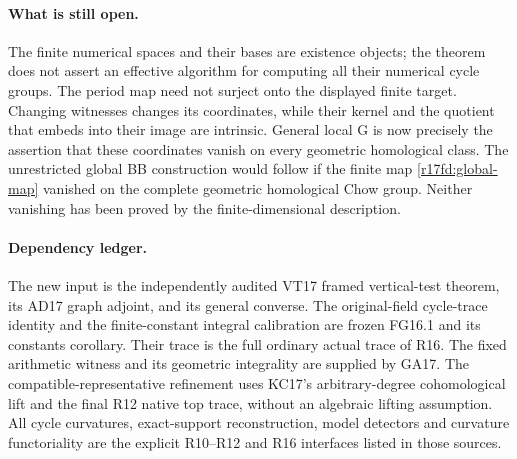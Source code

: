 \paragraph{What is still open.}
The finite numerical spaces and their bases are existence
objects; the theorem does not assert an effective algorithm
for computing all their numerical cycle groups. The period
map need not surject onto the displayed finite target.
Changing witnesses changes its coordinates, while their
kernel and the quotient that embeds into their image are
intrinsic. General local G is now precisely the assertion
that these coordinates vanish on every geometric homological
class. The unrestricted global BB construction would follow
if the finite map \eqref{r17fd:global-map} vanished on the
complete geometric homological Chow group. Neither vanishing
has been proved by the finite-dimensional description.

\paragraph{Dependency ledger.}
The new input is the independently audited VT17 framed
vertical-test theorem, its AD17 graph adjoint, and its
general converse. The original-field cycle-trace identity
and the finite-constant integral calibration are frozen
FG16.1 and its constants corollary. Their trace is the full
ordinary actual trace of R16. The fixed arithmetic witness
and its geometric integrality are supplied by GA17. The
compatible-representative refinement uses KC17's arbitrary-degree
cohomological lift and the final R12 native top trace, without
an algebraic lifting assumption. All
cycle curvatures, exact-support reconstruction, model
detectors and curvature functoriality are the explicit
R10--R12 and R16 interfaces listed in those sources.
